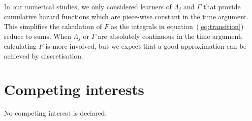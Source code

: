 \documentclass[11pt]{article}
\theoremstyle{thmstyleone}%
\theoremstyle{thmstyletwo}%
\theoremstyle{thmstylethree}%
\newcommand{\1}{\mathds{1}}
\begin{document}
In our numerical studies, we only considered learners of $\Lambda_j$ and
$\Gamma$ that provide cumulative hazard functions which are piece-wise constant
in the time argument. This simplifies the calculation of \( F \) as the
integrals in equation~(\ref{eq:transition}) reduce to sums. When $\Lambda_j$ or
\( \Gamma \) are absolutely continuous in the time argument, calculating \( F \)
is more involved, but we expect that a good approximation can be achieved by
discretisation.

\section{Competing interests}
No competing interest is declared.


\end{document}
